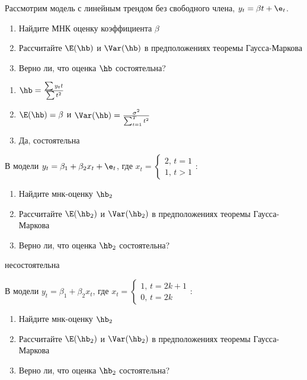 \documentclass[pdftex,11pt,openany]{book}\usepackage[]{graphicx}\usepackage[]{color}
\begin{document}
\begin{problem}
 Рассмотрим модель с линейным трендом без свободного члена, $y_t=\beta t +\e_t$.
\begin{enumerate}
\item Найдите МНК оценку коэффициента $\beta$
\item Рассчитайте $\E(\hb)$ и $\Var(\hb)$ в предположениях теоремы Гаусса-Маркова
\item Верно ли, что оценка $\hb$ состоятельна?
\end{enumerate}
\end{problem}


\begin{solution}
\begin{enumerate}
\item $\hb=\frac{\sum y_t t}{\sum t^2}$
\item $\E(\hb)=\beta$ и $\Var(\hb)=\frac{\sigma^2}{\sum_{t=1}^{T} t^2}$
\item Да, состоятельна
\end{enumerate}
\end{solution}


\begin{problem}
 В модели $y_t=\beta_1+\beta_2 x_t+\e_t$, где
$x_t=\left\{
\begin{array}{l}
2,\, t=1 \\
1,\, t>1
\end{array}
\right.
$:
\begin{enumerate}
\item Найдите мнк-оценку $\hb_2$
\item Рассчитайте $\E(\hb_2)$ и $\Var(\hb_2)$ в предположениях теоремы Гаусса-Маркова
\item Верно ли, что оценка $\hb_2$ состоятельна?
\end{enumerate}
\end{problem}

\begin{solution}
несостоятельна
\end{solution}


\begin{problem}
 В модели $y_t=\beta_1+\beta_2 x_t$, где
$x_t=\left\{
\begin{array}{l}
1,\, t=2k+1 \\
0,\, t=2k
\end{array}
\right.
$:
\begin{enumerate}
\item Найдите мнк-оценку $\hb_2$
\item Рассчитайте $\E(\hb_2)$ и $\Var(\hb_2)$ в предположениях теоремы Гаусса-Маркова
\item Верно ли, что оценка $\hb_2$ состоятельна?
\end{enumerate}
\end{problem}
\end{document}
